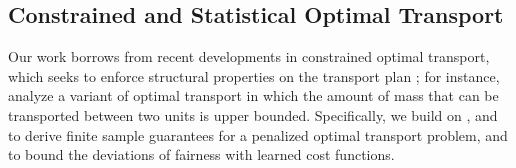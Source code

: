 \documentclass{article}
\theoremstyle{definition}
\begin{document}
\subsection{Constrained and Statistical Optimal Transport} Our work borrows from recent developments in constrained optimal transport, which seeks to enforce structural properties on the transport plan \citep{courty2016optimal,blondel2018smooth,paty2019subspace,liu2022sparsity}; for instance, \citet{korman2015optimal} analyze a variant of optimal transport in which the amount of mass that can be transported between two units is upper bounded. Specifically, we build on  
\citet{rakotomamonjy2015generalized}, \citet{genevay2019sample} and \citet{rigollet2022sample} to derive finite sample guarantees for a penalized optimal transport problem, and to bound the deviations of fairness with learned cost functions.
\end{document}
